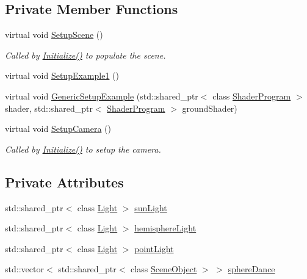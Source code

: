 \subsection*{Private Member Functions}
\begin{DoxyCompactItemize}
\item 
virtual void \hyperlink{class_assignment4_a38c50647bb65ff03aaf293fcc21dc5fd}{Setup\+Scene} ()
\begin{DoxyCompactList}\small\item\em Called by \hyperlink{class_application_a17cf1ea4552d26a1c20f7d98d793d41d}{Initialize()} to populate the scene. \end{DoxyCompactList}\item 
virtual void \hyperlink{class_assignment4_a019c1cc10bd21a91a88e68e11f86b846}{Setup\+Example1} ()
\item 
virtual void \hyperlink{class_assignment4_a440d520fc872a49fade29aa1eb7643d0}{Generic\+Setup\+Example} (std\+::shared\+\_\+ptr$<$ class \hyperlink{class_shader_program}{Shader\+Program} $>$ shader, std\+::shared\+\_\+ptr$<$ \hyperlink{class_shader_program}{Shader\+Program} $>$ ground\+Shader)
\item 
virtual void \hyperlink{class_assignment4_aa2bc15adb48cf54e477fce0c686cf2f0}{Setup\+Camera} ()
\begin{DoxyCompactList}\small\item\em Called by \hyperlink{class_application_a17cf1ea4552d26a1c20f7d98d793d41d}{Initialize()} to setup the camera. \end{DoxyCompactList}\end{DoxyCompactItemize}
\subsection*{Private Attributes}
\begin{DoxyCompactItemize}
\item 
std\+::shared\+\_\+ptr$<$ class \hyperlink{class_light}{Light} $>$ \hyperlink{class_assignment4_ab2981232ba58193de1682308a1dbafdc}{sun\+Light}
\item 
std\+::shared\+\_\+ptr$<$ class \hyperlink{class_light}{Light} $>$ \hyperlink{class_assignment4_a2ea813219380cc65ef89749586f5d4b5}{hemisphere\+Light}
\item 
std\+::shared\+\_\+ptr$<$ class \hyperlink{class_light}{Light} $>$ \hyperlink{class_assignment4_a327ee7158090e2a2db8763df3cb8608d}{point\+Light}
\item 
std\+::vector$<$ std\+::shared\+\_\+ptr$<$ class \hyperlink{class_scene_object}{Scene\+Object} $>$ $>$ \hyperlink{class_assignment4_aa16802895aa2aef461d130479c81a015}{sphere\+Dance}
\end{DoxyCompactItemize}
